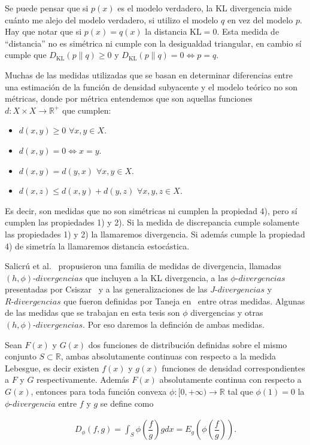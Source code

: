 Se puede pensar que si $p(x)$ es el modelo verdadero, la KL divergencia mide cu\'anto me alejo del modelo verdadero, si utilizo el modelo $q$ en vez del modelo $p$. Hay que notar que si $p(x)=q(x)$ la distancia $\text{KL}=0.$ Esta medida de ``distancia'' no es sim\'etrica ni cumple con la desigualdad triangular,  en cambio s\'i cumple que $D_{\text{KL}}(p \rVert q)\geq 0$ y $D_{\text{KL}}(p \rVert q)= 0 \Longleftrightarrow p=q.$ 

Muchas de las medidas utilizadas que se basan en determinar diferencias entre una estimación de la función de densidad subyacente y el modelo teórico no son métricas, donde por métrica entendemos que son aquellas funciones $d:X \times X\rightarrow \mathbb{R}^+$ que cumplen:

\begin{itemize}
	\label{metrica}
	\item $d(x,y)\geq 0$ $\forall x,y \in X$.
	\item $d(x,y)= 0 \Leftrightarrow x=y$.
	\item $d(x,y)=d(y,x)$  $\forall x,y \in X$.
	\item $d(x,z)\leq d(x,y)+d(y,z)$  $\forall x,y,z \in X$.
\end{itemize} 

Es decir, son medidas que no son simétricas ni cumplen la propiedad 4), pero sí cumplen las propiedades 1) y 2). Si la medida de discrepancia cumple solamente las propiedades 1) y 2) la llamaremos divergencia. Si además cumple la propiedad 4) de simetría la llamaremos distancia estocástica. 

Salicrú et al.~\cite{Salicru1994} propusieron una familia de medidas de divergencia, llamadas $(h,\phi) \text{-} divergencias$ que incluyen a la KL divergencia, a las $\phi \text{-} divergencias$ presentadas por Csiszar~\cite{Csiszar1967} y a las generalizaciones de las $J \text{-} divergencias$ y $R \text{-} divergencias$ que fueron definidas por Taneja en~\cite{Taneja1989} entre otras medidas. Algunas de las medidas que se trabajan en esta tesis son $\phi$ divergencias y otras  $(h,\phi) \text{-} divergencias$. Por eso daremos la definción de ambas medidas.

\begin{definition}
	\label{fiDivergencia}
	Sean $F(x)$ y $G(x)$ dos funciones de distribución definidas sobre el mismo conjunto $S \subset \mathbb{R}$, ambas absolutamente continuas con respecto a la medida Lebesgue, es decir existen $f(x)$ y $g(x)$ funciones de densidad correspondientes a $F$ y $G$ respectivamente. Además $F(x)$ absolutamente continua con respecto a $G(x)$, entonces para toda función convexa $\phi:[0,+\infty)\longrightarrow \mathbb{R}$ tal que $\phi(1)=0$ la $\phi \text{-} divergencia$ entre $f$ y $g$ se define como
	
	\begin{align}
		D_{\phi}(f, g)=\int_{S}  \phi\left(\dfrac{f}{g}\right) g dx=E_{g}\left(\phi\left(\dfrac{f}{g}\right)\right).
	\end{align}
\end{definition}

